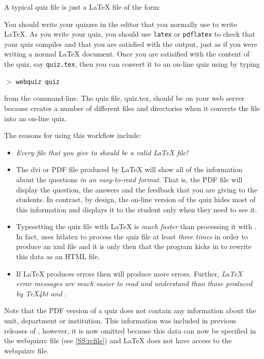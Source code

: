 \documentclass[svgnames]{article}
\newcommand\webquizrc{\index{webquizrc}\textsf{webquizrc}\xspace}
\begin{document}
  A typical \WebQuiz quiz file is just a \LaTeX{} file of the form:

    

  \noindent You should write your quizzes in the editor that you
  normally use to write \LaTeX. As you write your quiz, you should use
  \Verb|latex| or \Verb|pdflatex| to check that your quiz compiles and
  that you are satisfied with the output, just as if you were writing a
  normal \LaTeX{} document.  Once you are satisified with the content of the
  quiz, say \texttt{quiz.tex}, then you can convert it to an on-line quiz using \WebQuiz
  by typing
  \begin{center}
     $>$ \texttt{webquiz quiz}
  \end{center}
  from the command-line. The quiz file, \textsf{quiz.tex}, should be on
  your web server because \WebQuiz creates a number of different
  files and directories when it converts the file into an on-line quiz.

  The reasons for using this workflow include:
  \begin{itemize}
    \item
    \textit{Every file that you give to \WebQuiz should be a valid \LaTeX{} file!}

    \item The \textsf{dvi} or \textsf{PDF} file produced by \LaTeX{}
    will show all of the information about the questions
    \textit{in an easy-to-read format}. That is, the PDF file will
    display the question, the answers and the feedback that you are
    giving to the students. In contrast, by design, the on-line version
    of the quiz hides most of this information and displays it to the
    student only when they need to see it.

    \item Typesetting the quiz file with \LaTeX{} is \textit{much
    faster} than processing it with \WebQuiz. In fact, \WebQuiz uses
    \textsf{htlatex} to process the quiz file at least \textit{three times} in
    order to produce an \textsf{xml} file and it is only then that the
    \WebQuiz program kicks in to rewrite this data as an \textsf{HTML}
    file.

    \item If \LaTeX{} produces errors then \WebQuiz will produce more
    errors. Further, \textit{\LaTeX{} error messages are much easier to read and
    understand than those produced by \TeX4ht and \WebQuiz}.
  \end{itemize}
  Note that the PDF version of a quiz does not contain any
  information about the unit, department or institution. This
  information was included in previous releases of \WebQuiz, however, it
  is now omitted because this data can now be specified in the \webquizrc
  file (see \autoref{SS:rcfile}) and \LaTeX{} does not have access to
  the \webquizrc file.
\end{document}

